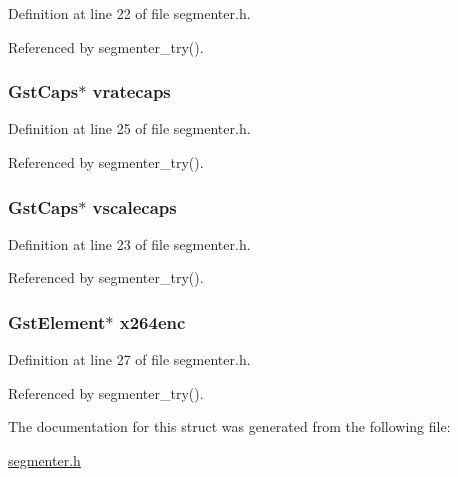 \-Definition at line 22 of file segmenter.\-h.



\-Referenced by segmenter\-\_\-try().

\hypertarget{struct__video__bag_aa7a0309620904096b3d69456f926e19d}{
\subsubsection[{vratecaps}]{\setlength{\rightskip}{0pt plus 5cm}\-Gst\-Caps$\ast$ {\bf vratecaps}}}\label{struct__video__bag_aa7a0309620904096b3d69456f926e19d}


\-Definition at line 25 of file segmenter.\-h.



\-Referenced by segmenter\-\_\-try().

\hypertarget{struct__video__bag_aa5f3820b0694a8f5358db66149ec7f10}{
\subsubsection[{vscalecaps}]{\setlength{\rightskip}{0pt plus 5cm}\-Gst\-Caps$\ast$ {\bf vscalecaps}}}\label{struct__video__bag_aa5f3820b0694a8f5358db66149ec7f10}


\-Definition at line 23 of file segmenter.\-h.



\-Referenced by segmenter\-\_\-try().

\hypertarget{struct__video__bag_a84465e4de5a0a5270d0b3d0f03e93f03}{
\subsubsection[{x264enc}]{\setlength{\rightskip}{0pt plus 5cm}\-Gst\-Element$\ast$ {\bf x264enc}}}\label{struct__video__bag_a84465e4de5a0a5270d0b3d0f03e93f03}


\-Definition at line 27 of file segmenter.\-h.



\-Referenced by segmenter\-\_\-try().



\-The documentation for this struct was generated from the following file\-:\begin{DoxyCompactItemize}
\item 
\hyperlink{segmenter_8h}{segmenter.\-h}\end{DoxyCompactItemize}
